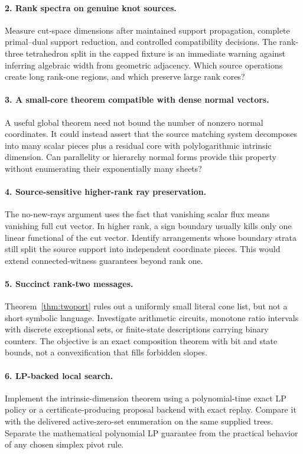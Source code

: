 \paragraph{2. Rank spectra on genuine knot sources.}
Measure cut-space dimensions after maintained support propagation, complete
primal--dual support reduction, and controlled compatibility decisions. The
rank-three tetrahedron split in the capped fixture is an immediate warning
against inferring algebraic width from geometric adjacency. Which source
operations create long rank-one regions, and which preserve large rank cores?

\paragraph{3. A small-core theorem compatible with dense normal vectors.}
A useful global theorem need not bound the number of nonzero normal
coordinates. It could instead assert that the source matching system decomposes
into many scalar pieces plus a residual core with polylogarithmic intrinsic
dimension. Can parallelity or hierarchy normal forms provide this property
without enumerating their exponentially many sheets?

\paragraph{4. Source-sensitive higher-rank ray preservation.}
The no-new-rays argument uses the fact that vanishing scalar flux means
vanishing full cut vector. In higher rank, a sign boundary usually kills only
one linear functional of the cut vector. Identify arrangements whose boundary
strata still split the source support into independent coordinate pieces.
This would extend connected-witness guarantees beyond rank one.

\paragraph{5. Succinct rank-two messages.}
Theorem~\ref{thm:twoport} rules out a uniformly small literal cone list, but not
a short symbolic language. Investigate arithmetic circuits, monotone ratio
intervals with discrete exceptional sets, or finite-state descriptions carrying
binary counters. The objective is an exact composition theorem with bit and
state bounds, not a convexification that fills forbidden slopes.

\paragraph{6. LP-backed local search.}
Implement the intrinsic-dimension theorem using a polynomial-time exact LP
policy or a certificate-producing proposal backend with exact replay. Compare
it with the delivered active-zero-set enumeration on the same supplied trees.
Separate the mathematical polynomial LP guarantee from the practical behavior
of any chosen simplex pivot rule.

